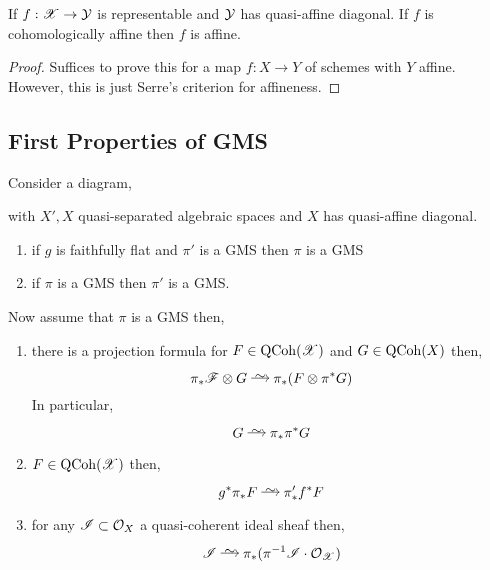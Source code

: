 \documentclass[12pt]{article}
\begin{document}
\begin{cor}
If $f : \mathscr{X} \to \mathcal{Y}$ is representable and $\mathcal{Y}$ has quasi-affine diagonal. If $f$ is cohomologically affine then $f$ is affine.
\end{cor}

\begin{proof}
Suffices to prove this for a map $f : X \to Y$ of schemes with $Y$ affine. However, this is just Serre's criterion for affineness. 
\end{proof}

\subsection{First Properties of GMS}

\begin{lemma}
Consider a diagram,
\begin{center}
\end{center}
with $X', X$ quasi-separated algebraic spaces and $X$ has quasi-affine diagonal.
\begin{enumerate}
\item if $g$ is faithfully flat and $\pi'$ is a GMS then $\pi$ is a GMS
\item if $\pi$ is a GMS then $\pi'$ is a GMS.
\end{enumerate}
Now assume that $\pi$ is a GMS then,
\begin{enumerate}
\item there is a projection formula for $F \in \mathrm{QCoh}(\mathscr{X})$ and $G \in \mathrm{QCoh}(X)$ then,
\[ \pi_* \F \ot G \iso \pi_* (F \ot \pi^* G) \]
In particular,
\[ G \iso \pi_* \pi^* G \]
\item $F \in \mathrm{QCoh}(\mathscr{X})$ then,
\[ g^* \pi_* F \iso \pi'_* f^* F \]
\item for any $\mathscr{I} \subset \mathcal{O}_{X}$ a quasi-coherent ideal sheaf then,
\[ \I \iso \pi_* (\pi^{-1} \I \cdot \struct{\X}) \]
\end{enumerate}
\end{lemma}
\end{document}
